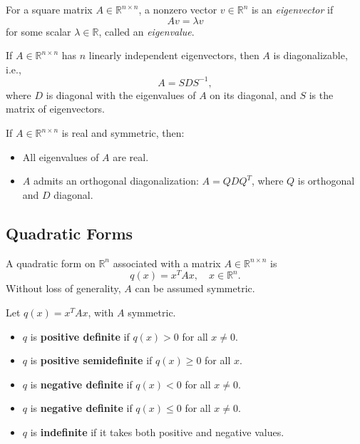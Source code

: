 \begin{definition}
For a square matrix $A \in \mathbb{R}^{n \times n}$, a nonzero vector $v \in \mathbb{R}^n$ is an \emph{eigenvector} if 
\[
Av = \lambda v
\]
for some scalar $\lambda \in \mathbb{R}$, called an \emph{eigenvalue}.
\end{definition}

\begin{theorem}[Diagonalization]
If $A \in \mathbb{R}^{n \times n}$ has $n$ linearly independent eigenvectors, then $A$ is diagonalizable, i.e.,
\[
A = S D S^{-1},
\]
where $D$ is diagonal with the eigenvalues of $A$ on its diagonal, and $S$ is the matrix of eigenvectors.
\end{theorem}

\begin{theorem}
If $A \in \mathbb{R}^{n \times n}$ is real and symmetric, then:
\begin{itemize}
    \item All eigenvalues of $A$ are real.
    \item $A$ admits an orthogonal diagonalization: $A = Q D Q^T$, where $Q$ is orthogonal and $D$ diagonal.
\end{itemize}
\end{theorem}

\subsection{Quadratic Forms}

A quadratic form on $\mathbb{R}^n$ associated with a matrix $A \in \mathbb{R}^{n \times n}$ is
\[
q(x) = x^T A x, \quad x \in \mathbb{R}^n.
\]
Without loss of generality, $A$ can be assumed symmetric.

\begin{definition}
Let $q(x) = x^T A x$, with $A$ symmetric.
\begin{itemize}
    \item $q$ is \textbf{positive definite} if $q(x) > 0$ for all $x \neq 0$.
    \item $q$ is \textbf{positive semidefinite} if $q(x) \geq 0$ for all $x$.
    \item $q$ is \textbf{negative definite} if $q(x) < 0$ for all $x \neq 0$.
    \item $q$ is \textbf{negative definite} if $q(x) \leq 0$ for all $x \neq 0$.
    \item $q$ is \textbf{indefinite} if it takes both positive and negative values.
\end{itemize}
\end{definition}

